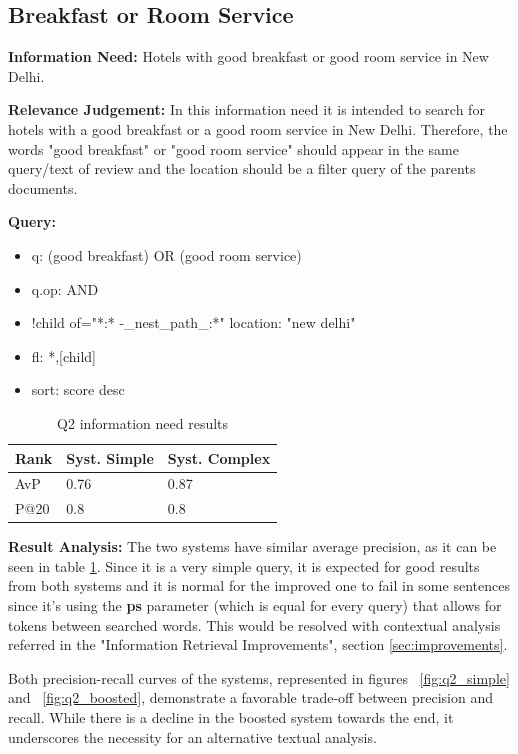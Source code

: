 \documentclass[sigconf]{acmart}
\begin{document}
\subsection{Breakfast or Room Service}


\textbf{Information Need:} Hotels with good breakfast or good room service in New Delhi.

\textbf{Relevance Judgement:} In this information need it is intended to search for hotels with a good breakfast or a good room service in New Delhi. Therefore, the words "good breakfast" or "good room service" should appear in the same query/text of review and the location should be a filter query of the parents documents.

\textbf{Query:}

\begin{itemize}
    \item q: (good breakfast) OR (good room service)
    \item q.op: AND
    \item {!child of="*:* -\_nest\_path\_:*"} location: "new delhi"
    \item fl: *,[child]
    \item sort: score desc
\end{itemize}

\begin{table}[h]
\caption{Q2 information need results}
\label{tab:q2}
\begin{tabular}{lll}
\toprule
Rank & Syst. Simple & Syst. Complex\\
\midrule
AvP & 0.76 & 0.87  \\
P@20 & 0.8 & 0.8 \\
\bottomrule
\end{tabular}
\end{table}

\textbf{Result Analysis:}\label{ra_q2} The two systems have similar average precision, as it can be seen in table \ref{tab:q2}. Since it is a very simple query, it is expected for good results from both systems and it is normal for the improved one to fail in some sentences since it's using the \textbf{ps} parameter (which is equal for every query) that allows for tokens between searched words. This would be resolved with contextual analysis referred in the "Information Retrieval Improvements", section \ref{sec:improvements}.

Both precision-recall curves of the systems, represented in figures ~\ref{fig:q2_simple} and ~\ref{fig:q2_boosted}, demonstrate a favorable trade-off between precision and recall. While there is a decline in the boosted system towards the end, it underscores the necessity for an alternative textual analysis.
\end{document}
